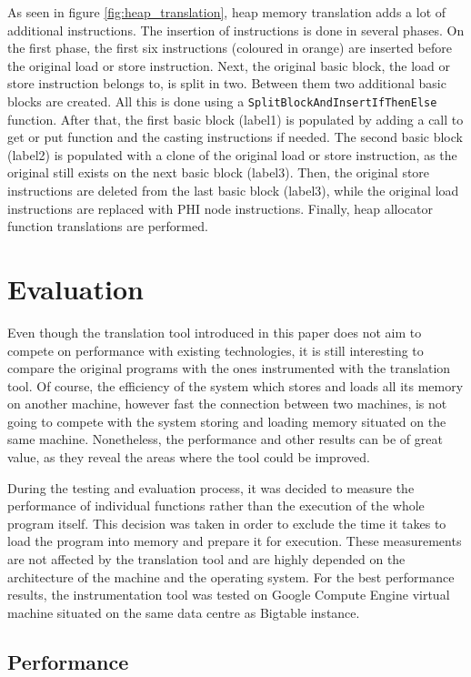\documentclass[bsc,frontabs,twoside,singlespacing,parskip,deptreport]{infthesis}     %
\begin{document}
As seen in figure \ref{fig:heap_translation}, heap memory translation adds a lot of additional instructions. The insertion of instructions is done in several phases. On the first phase, the first six instructions (coloured in orange) are inserted before the original load or store instruction. Next, the original basic block, the load or store instruction belongs to, is split in two. Between them two additional basic blocks are created. All this is done using a \texttt{SplitBlockAndInsertIfThenElse} function. After that, the first basic block (label1) is populated by adding a call to get or put function and the casting instructions if needed. The second basic block (label2) is populated with a clone of the original load or store instruction, as the original still exists on the next basic block (label3). Then, the original store instructions are deleted from the last basic block (label3), while the original load instructions are replaced with PHI node instructions. Finally, heap allocator function translations are performed.

\chapter{Evaluation}

Even though the translation tool introduced in this paper does not aim to compete on performance with existing technologies, it is still interesting to compare the original  programs with the ones instrumented with the translation tool. Of course, the efficiency of the system which stores and loads all its memory on another machine, however fast the connection between two machines, is not going to compete with the system storing and loading memory situated on the same machine. Nonetheless, the performance and other results can be of great value, as they reveal the areas where the tool could be improved.

During the testing and evaluation process, it was decided to measure the performance of individual functions rather than the execution of the whole program itself. This decision was taken in order to exclude the time it takes to load the program into memory and prepare it for execution. These measurements are not affected by the translation tool and are highly depended on the architecture of the machine and the operating system. For the best performance results, the instrumentation tool was tested on Google Compute Engine virtual machine situated on the same data centre as Bigtable instance. 

\section{Performance}
\end{document}
